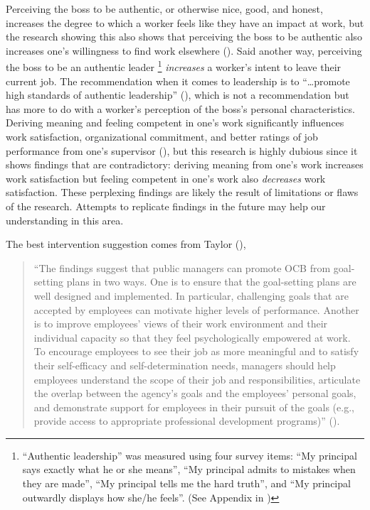 \documentclass[
  11pt,
  a4paper,
]{article}
\begin{document}
Perceiving the boss to be authentic, or otherwise nice, good, and
honest, increases the degree to which a worker feels like they have an
impact at work, but the research showing this also shows that perceiving
the boss to be authentic also increases one's willingness to find work
elsewhere (). Said another way, perceiving the boss to be an
authentic leader \footnote{``Authentic leadership'' was measured using
  four survey items: ``My principal says exactly what he or she means'',
  ``My principal admits to mistakes when they are made'', ``My principal
  tells me the hard truth'', and ``My principal outwardly displays how
  she/he feels''. (See Appendix in
  )} \emph{increases} a worker's intent to leave their current job.
The recommendation when it comes to leadership is to ``\ldots promote
high standards of authentic leadership''
(), which is not a recommendation but has more to do with a
worker's perception of the boss's personal characteristics. Deriving
meaning and feeling competent in one's work significantly influences
work satisfaction, organizational commitment, and better ratings of job
performance from one's supervisor (), but this research is highly dubious since it
shows findings that are contradictory: deriving meaning from one's work
increases work satisfaction but feeling competent in one's work also
\emph{decreases} work satisfaction. These perplexing findings are likely
the result of limitations or flaws of the research. Attempts to
replicate findings in the future may help our understanding in this
area.

The best intervention suggestion comes from Taylor
(),

\begin{quote}
``The findings suggest that public managers can promote OCB from
goal-setting plans in two ways. One is to ensure that the goal-setting
plans are well designed and implemented. In particular, challenging
goals that are accepted by employees can motivate higher levels of
performance. Another is to improve employees' views of their work
environment and their individual capacity so that they feel
psychologically empowered at work. To encourage employees to see their
job as more meaningful and to satisfy their self-efficacy and
self-determination needs, managers should help employees understand the
scope of their job and responsibilities, articulate the overlap between
the agency's goals and the employees' personal goals, and demonstrate
support for employees in their pursuit of the goals (e.g., provide
access to appropriate professional development programs)''
().
\end{quote}
\end{document}
